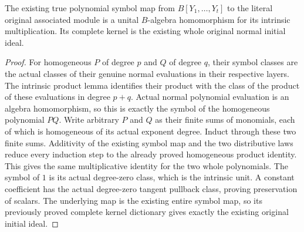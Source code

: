 \begin{lemma}
\label{hir:relative-normal-intrinsic-polynomial-symbol-algebra-hom}
\leanok
{}
The existing true polynomial symbol map from $B[Y_1,\ldots,Y_t]$ to the
literal original associated module is a unital $B$-algebra homomorphism
for its intrinsic multiplication. Its complete kernel is the existing
whole original normal initial ideal.
\end{lemma}
\begin{proof}
For homogeneous $P$ of degree $p$ and $Q$ of degree $q$, their symbol
classes are the actual classes of their genuine normal evaluations in
their respective layers. The intrinsic product lemma identifies their
product with the class of the product of these evaluations in degree
$p+q$. Actual normal polynomial evaluation is an algebra homomorphism,
so this is exactly the symbol of the homogeneous polynomial $PQ$.
Write arbitrary $P$ and $Q$ as their finite sums of monomials, each of
which is homogeneous of its actual exponent degree. Induct through these
two finite sums. Additivity of the existing symbol map and the two
distributive laws reduce every induction step to the already proved
homogeneous product identity. This gives the same multiplicative identity
for the two whole polynomials.
The symbol of $1$ is its actual degree-zero class, which is the
intrinsic unit. A constant coefficient has the actual degree-zero tangent
pullback class, proving preservation of scalars. The underlying map is
the existing entire symbol map, so its previously proved complete
kernel dictionary gives exactly the existing original initial ideal.
\end{proof}

